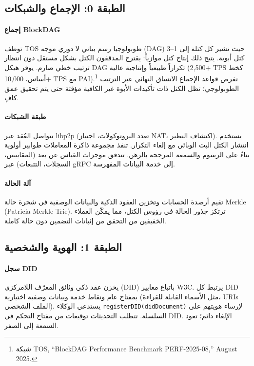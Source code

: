 \documentclass[11pt]{article}
\begin{document}
\subsection{الطبقة 0: الإجماع والشبكات}
\paragraph{إجماع BlockDAG} توظف TOS طوبولوجيا رسم بياني لا دوري موجه (DAG) حيث تشير كل كتلة إلى 1--3 كتل أبوية. يتيح ذلك إنتاج كتل موازياً: يقترح المدققون الكتل بشكل مستقل دون انتظار ترتيب خطي صارم. يوفر هيكل DAG تكراراً طبيعياً وإنتاجية عالية (2,500+ TPS كخط أساس، 10,000+ TPS مع PAI).\footnote{شبكة TOS, ``BlockDAG Performance Benchmark PERF-2025-08,'' August 2025.} تفرض قواعد الإجماع الاتساق النهائي عبر الترتيب الطوبولوجي؛ تظل الكتل ذات تأكيدات الأبوة غير الكافية مؤقتة حتى يتم تحقيق عمق كافٍ.

\paragraph{طبقة الشبكات} تتواصل العُقد عبر libp2p (تعدد البروتوكولات، اجتياز NAT، اكتشاف النظير). يستخدم انتشار الكتل البث الوبائي مع إلغاء التكرار. تنفذ مجموعة ذاكرة المعاملات طوابير أولوية بناءً على الرسوم والسمعة المرجحة بالرهن. تتدفق موجزات القياس عن بعد (المقاييس، السجلات، التتبعات) عبر gRPC إلى خدمة البيانات المفهرسة.

\paragraph{آلة الحالة} تقيم أرصدة الحسابات وتخزين العقود الذكية والبيانات الوصفية في شجرة حالة Merkle (Patricia Merkle Trie). ترتكز جذور الحالة في رؤوس الكتل، مما يمكّن العملاء الخفيفين من التحقق من إثباتات التضمين دون حالة كاملة.

\subsection{الطبقة 1: الهوية والشخصية}
\paragraph{سجل DID} يخزن عقد ذكي وثائق المعرّف اللامركزي (DID) باتباع معايير W3C. يرتبط كل DID بمفتاح عام ونقاط خدمة وبيانات وصفية اختيارية (مثل الأسماء القابلة للقراءة، URIs الملف الشخصي). يستدعي الوكلاء \texttt{registerDID(didDocument)} لإرساء هويتهم على السلسلة. تتطلب التحديثات توقيعات من مفتاح التحكم في DID. الإلغاء دائم؛ تعود السمعة إلى الصفر.
\end{document}
